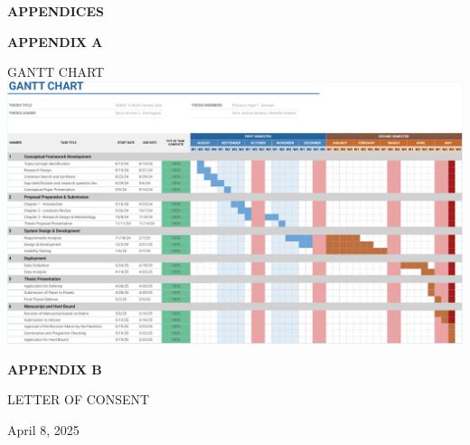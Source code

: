 \newpage
\appendix

\begin{center}
	{\large\bf APPENDICES}\\[12pt]
\end{center}

\begin{center}
	{\bf APPENDIX A}\\[36pt]
\end{center}

\begin{center}
	GANTT CHART
	\includegraphics[width=1\textwidth]{app/AA.pdf}
\end{center}

\clearpage

\begin{center}
	{\bf APPENDIX B}\\[18pt]
\end{center}

\begin{center}
	LETTER OF CONSENT
\end{center}

\vspace{8pt}

\footnotesize

\noindent April 8, 2025

\vspace{8pt}


